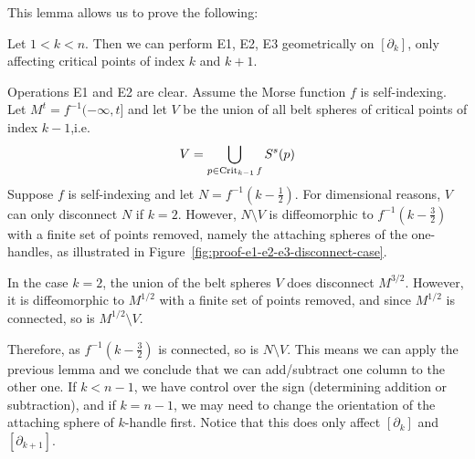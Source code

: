 This lemma allows us to prove the following:
\begin{theorem}
    Let $1 < k < n$. Then we can perform E1, E2, E3 geometrically on $[\partial_k]$, only affecting critical points of index $k$ and $k+1$.
\end{theorem}
\begin{myproof}
    Operations E1 and E2 are clear.
    Assume the Morse function $f$ is self-indexing.
    Let  $M^{t} = f^{-1}(-\infty, t]$ and let $V$ be the union of all belt spheres of critical points of index $k-1$,i.e. \[
        V = \bigcup_{p \in \operatorname{Crit}_{k-1} f} S^{s}(p)
    \]
    Suppose $f$ is self-indexing and let $N = f^{-1}(k - \frac{1}{2})$.
    For dimensional reasons, $V$ can only disconnect $N$ if  $k = 2$.
    However, $N \setminus V$ is diffeomorphic to $f^{-1}(k - \frac{3}{2})$ with a finite set of points removed, namely the attaching spheres of the one-handles, as illustrated in Figure~\ref{fig:proof-e1-e2-e3-disconnect-case}.
    \begin{marginfigure}
        \centering
        \caption{In the case $k = 2$, the union of the belt spheres $V$ does disconnect $M^{3 / 2}$. However, it is diffeomorphic to $M^{ 1 / 2}$ with a finite set of points removed, and since $M^{ 1 / 2}$ is connected, so is  $M^{ 1 / 2} \setminus V$.}
        \label{fig:proof-e1-e2-e3-disconnect-case}
    \end{marginfigure}
    Therefore, as $f^{-1}(k- \frac{3}{2})$ is connected, so is $N \setminus V$.
    This means we can apply the previous lemma and we conclude that we can add/subtract one column to the other one.
    If $k < n-1$, we have control over the sign (determining addition or subtraction), and if $k = n-1$, we may need to change the orientation of the attaching sphere of  $k$-handle first.
    Notice that this does only affect $[\partial_k]$ and $[\partial_{k+1}]$.
\end{myproof}

